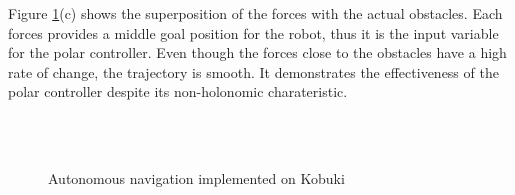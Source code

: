 \documentclass[conference]{IEEEtran}
\begin{document}
Figure \ref{f:kbki}(c) shows the superposition of the forces with the actual obstacles. Each forces provides a middle goal position for the robot, thus it is the input variable for the polar controller. Even though the forces close to the obstacles have a high rate of change, the trajectory is smooth. It demonstrates the effectiveness of the polar controller despite its non-holonomic charateristic. 
\begin{figure}
	\centering
	\\
	\\
	\caption{Autonomous navigation implemented on Kobuki} \label{f:kbki}
\end{figure}
\end{document}
